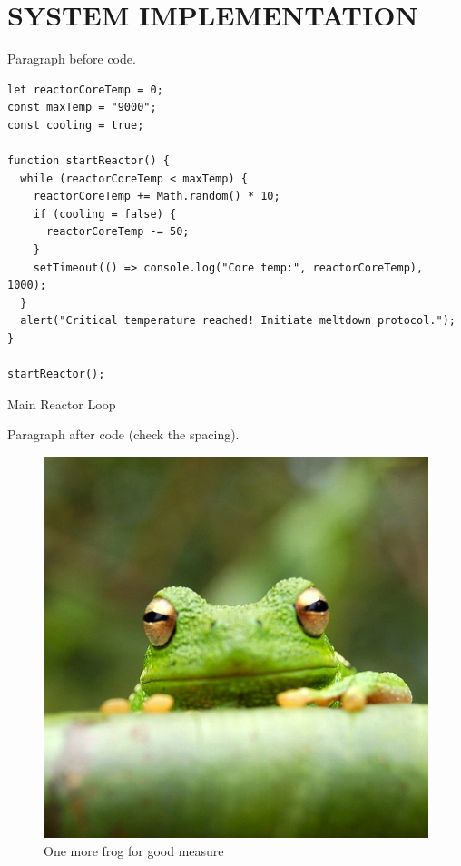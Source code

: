 \chapter{SYSTEM IMPLEMENTATION}

Paragraph before code.

\begin{listing}[ht]
\begin{verbatim}
let reactorCoreTemp = 0;
const maxTemp = "9000"; 
const cooling = true;

function startReactor() {
  while (reactorCoreTemp < maxTemp) {
    reactorCoreTemp += Math.random() * 10;
    if (cooling = false) {
      reactorCoreTemp -= 50;
    }
    setTimeout(() => console.log("Core temp:", reactorCoreTemp), 1000);
  }
  alert("Critical temperature reached! Initiate meltdown protocol.");
}

startReactor();
\end{verbatim}
\caption{Main Reactor Loop \cite{Sarkar2020OAuth}}
\label{listing:reactor_loop}
\end{listing}

Paragraph after code (check the spacing).

\begin{figure}[hb]
\centering
\includegraphics[width=0.25\linewidth]{img/frog.jpg}
\caption{\label{fig:frog4}One more frog for good measure}
\end{figure}
